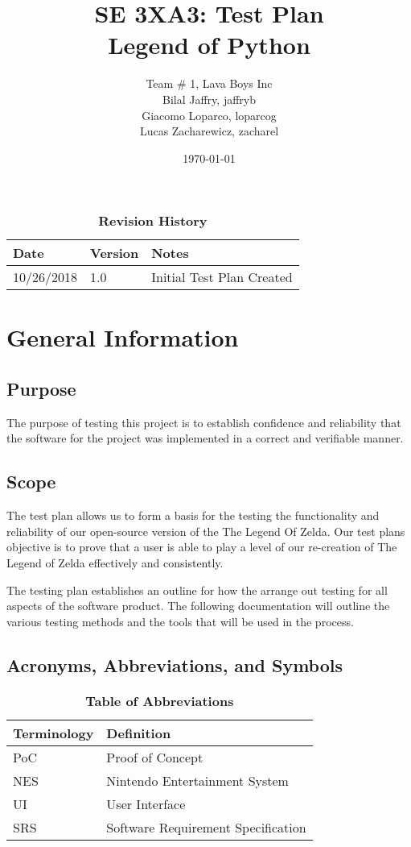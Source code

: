 \documentclass[12pt, titlepage]{article}
\title{SE 3XA3: Test Plan\\Legend of Python}
\author{Team \# 1, Lava Boys Inc
		\\ Bilal Jaffry, jaffryb
		\\ Giacomo Loparco, loparcog
		\\ Lucas Zacharewicz, zacharel
}
\date{\today}
\begin{document}
\maketitle

\tableofcontents
\listoftables
\listoffigures

\begin{table}[bp]
\caption{\bf Revision History}
\begin{tabularx}{\textwidth}{p{3cm}p{2cm}X}
\toprule {\bf Date} & {\bf Version} & {\bf Notes}\\
\midrule
10/26/2018 & 1.0 & Initial Test Plan Created\\
\bottomrule
\end{tabularx}
\end{table}


\newpage
\section{General Information}

\subsection{Purpose}
The purpose of testing this project is to establish confidence and reliability that the software for the project
was implemented in a correct and verifiable manner. 
\subsection{Scope}
The test plan allows us to form a basis for the testing the functionality and reliability of our open-source version of the The Legend Of Zelda. Our test plans objective is to prove that a user is able to play a level of our re-creation of The Legend of Zelda effectively and consistently.

The testing plan establishes an outline for how the arrange out testing for all aspects of the software product. The following documentation will outline the various testing methods and the tools that will be used in the process.

\subsection{Acronyms, Abbreviations, and Symbols}

\begin{table}[hbp]
	\caption{\textbf{Table of Abbreviations}} \label{Table}
	
	\begin{tabularx}{\textwidth}{p{3cm}X}
		\toprule
		\textbf{Terminology} & \textbf{Definition} \\
		\midrule
		PoC & Proof of Concept\\
		NES & Nintendo Entertainment System\\
		UI & User Interface\\
		SRS & Software Requirement Specification\\
		\bottomrule
	\end{tabularx}
	
\end{table}
\end{document}
